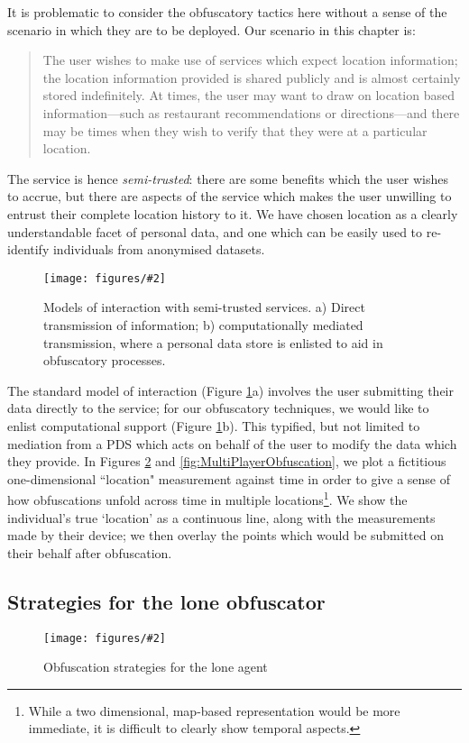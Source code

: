 \documentclass{IOS-Book-Article}     %
\newcommand{\fig}[3][0.9]{
\begin{figure}[tp]
\begin{center}
\texttt{[image: figures/\#2]}
\caption{#3}
\label{fig:#2}
\end{center}
\end{figure}
}
\begin{document}
It is problematic to consider the obfuscatory tactics here without a sense of
the scenario in which they are to be deployed. Our scenario in this chapter is:
\begin{quote}
The user wishes to make use of services which expect location information; 
the location information provided is shared publicly and is almost
certainly stored indefinitely. At times, the user may want to draw on location
based information---such as restaurant recommendations or directions---and there
may be times when they wish to verify that they were at a particular location.
\end{quote}
The service is hence \emph{semi-trusted}: there are some benefits which the user
wishes to accrue, but there are aspects of the service which makes the user
unwilling to entrust their complete location history to it. We have chosen location
as a clearly understandable facet of personal data, and one which can be easily
used to re-identify individuals from anonymised
datasets\cite{montjoye2013Unique}.

\fig{Mediation}{Models of interaction with semi-trusted services. a) Direct
transmission of information; b) computationally mediated transmission, where a
personal data store is enlisted to aid in obfuscatory processes.}

The standard model of interaction (Figure \ref{fig:Mediation}a) involves the
user submitting their data directly to the service; for our obfuscatory
techniques, we would like to enlist computational support (Figure
\ref{fig:Mediation}b). This typified, but not limited to mediation from a PDS
which acts on behalf of the user to modify the data which they provide.
In Figures \ref{fig:SinglePlayerObfuscation} and
\ref{fig:MultiPlayerObfuscation}, we plot a fictitious one-dimensional
``location" measurement against time in order to give a sense of how
obfuscations unfold across time in multiple locations\footnote{While a two
dimensional, map-based representation would be more immediate, it is difficult
to clearly show temporal aspects.}. We show the individual's true `location' as
a continuous line, along with the measurements made by their device; we then
overlay the points which would be submitted on their behalf after obfuscation.

\subsection{Strategies for the lone obfuscator}

\fig[1.05]{SinglePlayerObfuscation}{Obfuscation strategies for the lone agent}
\end{document}

